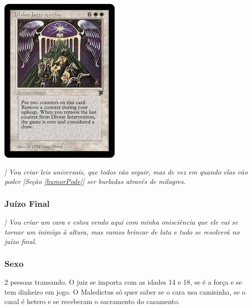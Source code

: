 \documentclass[12pt,a4paper]{article}
\begin{document}
				\begin{center}
				\includegraphics{milagre}
				\end{center}

				\begin{flushright}
				\end{flushright}

				\emph{| Vou criar leis universais, que todos v\~ao seguir, mas de vez em quando elas v\~ao poder [Se\c{c}\~ao \ref{humorPode}] ser burladas atrav\'es de milagres.}

			\subsubsection{Ju\'izo Final}

				\begin{flushright}
				\end{flushright}

				\emph{| Vou criar um cara e estou vendo aqui com minha onisci\^encia que ele vai se tornar um inimigo \`a altura, mas vamos brincar de luta e tudo se resolver\'a no ju\'izo final.}

			\subsubsection{Sexo}\label{sexo}
				\begin{flushright}
				\end{flushright}

				2 pessoas transando. O juiz se importa com as idades 14 e 18, se \'e a
for\c{c}a e se tem dinheiro em jogo. O Maledictus s\'o quer saber se o cara
usa camisinha, se o casal \'e hetero e se receberam o sacramento do
casamento.
\end{document}
